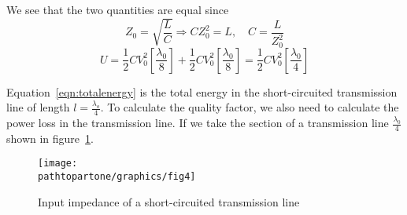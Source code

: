 We see that the two quantities are equal since
\begin{equation*}
Z_0 = \sqrt{\frac{L}{C}}\Longrightarrow CZ_0^{2} = L,\quad C = \frac{L}{Z_0^{2}}
\end{equation*}
\begin{dmath}
U = \frac{1}{2}CV_0^{2}\left[\frac{\lambda_{0}}{8}\right] +\frac{1}{2}CV_0^{2}\left[\frac{\lambda_{0}}{8}\right]
= \frac{1}{2}CV_0^{2}\left[\frac{\lambda_{0}}{4}\right]
\label{eqn:totalenergy}
\end{dmath}

Equation~\eqref{eqn:totalenergy} is the total energy in the short-circuited transmission line of length $l = \frac{\lambda_o}{4}$. To calculate the quality factor, we also need to calculate the power loss in the transmission line. If we take the section of a transmission line $\frac{\lambda_{0}}{4}$ shown in figure~\ref{fig:fig4}.
\begin{figure}[h]
\centering
\texttt{[image: \\pathtopartone/graphics/fig4]}
\caption{Input impedance of a short-circuited transmission line}
\label{fig:fig4}
\end{figure}

